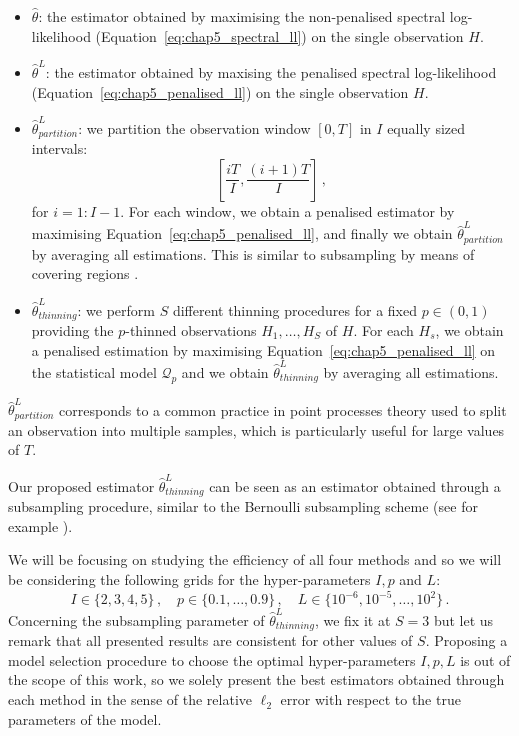     \begin{itemize}
        \item $\hat \theta$: the estimator obtained by maximising the non-penalised spectral log-likelihood (Equation~\eqref{eq:chap5_spectral_ll}) on the single observation $H$.
        \item $\hat \theta^L$: the estimator obtained by maxising the penalised spectral log-likelihood (Equation~\eqref{eq:chap5_penalised_ll}) on the single observation $H$.
        \item $\hat \theta^L_{partition}$: we partition the observation window $[0,T]$ in $I$ equally sized intervals: \[\left[\frac{iT}{I}, \frac{(i+1)T}{I}\right]\,,\] for $i=1:I-1$. For each window, we obtain a penalised estimator by maximising Equation~\eqref{eq:chap5_penalised_ll}, and finally we obtain $\hat \theta^L_{partition}$ by averaging all estimations. This is similar to subsampling by means of covering regions \parencite{Possolo1991, Politis1999, Guan2007}.
        \item $\hat \theta^L_{thinning}$: we perform $S$ different thinning procedures for a fixed $p\in(0,1)$ providing the $p$-thinned observations $H_1, \ldots, H_S$ of $H$. For each $H_s$, we obtain a penalised estimation by maximising Equation~\eqref{eq:chap5_penalised_ll} on the statistical model $\mathcal{Q}_p$ and we obtain $\hat \theta^L_{thinning}$ by averaging all estimations.
    \end{itemize}

    $\hat \theta^L_{partition}$ corresponds to a common practice in point processes theory used to split an observation into multiple samples, which is particularly useful for large values of $T$.

    Our proposed estimator $\hat \theta^L_{thinning}$ can be seen as an estimator obtained through a subsampling procedure, similar to the Bernoulli subsampling scheme (see for example \textcite[Chapter 3.2]{Sarndal2003}). 
    
    We will be focusing on studying the efficiency of all four methods and so we will be considering the following grids for the hyper-parameters $I, p$ and $L$:
    \[I\in\{2,3,4,5\}\,,\quad p\in\{0.1, \ldots, 0.9\}\,,\quad L\in\{10^{-6}, 10^{-5}, \ldots, 10^2\}\,.\]
    Concerning the subsampling parameter of $\hat \theta^L_{thinning}$, we fix it at $S=3$ but let us remark that all presented results are consistent for other values of $S$.
    Proposing a model selection procedure to choose the optimal hyper-parameters $I, p, L$ is out of the scope of this work, 
    so we solely present the best estimators obtained through each method in the sense of the relative $\ell_2$ error with respect to the true parameters of the model.

